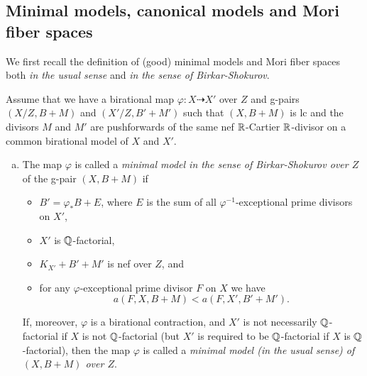 	
	\subsection{Minimal models, canonical models and Mori fiber spaces}
	\label{subsection:MM_CM_MFS}
	
	We first recall the definition of (good) minimal models and Mori fiber spaces both \emph{in the usual sense} and \emph{in the sense of Birkar-Shokurov}.
	
	\begin{dfn}\label{dfn:MM_MFS}
		Assume that we have a birational map $\varphi \colon X \dashrightarrow X'$ over $ Z $ and g-pairs $(X/Z,B+M)$ and $(X'/Z,B'+M')$ such that $(X,B+M)$ is lc and the divisors $ M $ and $ M' $ are pushforwards of the same nef $ \mathbb{R} $-Cartier $\mathbb{R}$-divisor on a common birational model of $X$ and $X'$.
		
		\begin{center}
		\end{center}
		
		\begin{enumerate}[(a)]
			\item The map $\varphi$ is called a \emph{minimal model in the sense of Birkar-Shokurov over $Z$} of the g-pair $(X,B+M)$ if 
			\begin{itemize}
				\item $ B' =\varphi_*B+E$, where $E$ is the sum of all $ \varphi^{-1} $-exceptional prime divisors on $ X' $,
				
				\item $X'$ is $\mathbb{Q}$-factorial,
				
				\item $K_{X'}+B'+M'$ is nef over $Z$, and 
				
				\item for any $\varphi $-exceptional prime divisor $ F $ on $ X $ we have 
				\[ a(F,X,B+M) < a(F,X',B'+M') . \]
			\end{itemize}
			
			If, moreover, $\varphi$ is a birational contraction, and $X'$ is not necessarily $\mathbb{Q}$-factorial if $X$ is not $\mathbb{Q}$-factorial (but $X'$ is required to be $\mathbb{Q}$-factorial if $X$ is $\mathbb{Q}$-factorial), then the map $\varphi$ is called a \emph{minimal model (in the usual sense) of $(X,B+M)$ over $ Z $}.
			

\end{enumerate}
\end{dfn}
